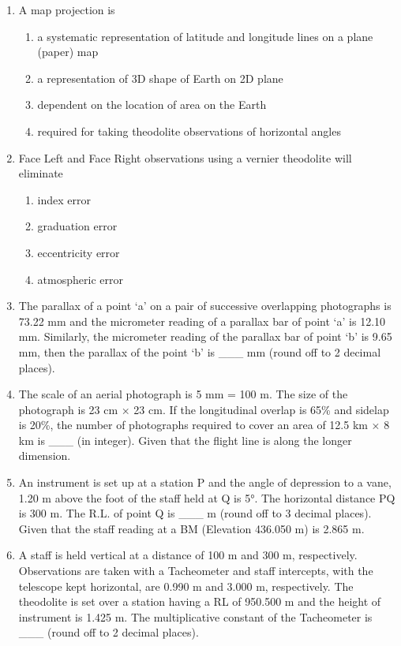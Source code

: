 \documentclass[12pt,a4paper]{article}
\begin{document}
\begin{enumerate}
\item A map projection is
\begin{enumerate}
    \item a systematic representation of latitude and longitude lines on a plane (paper) map
    \item a representation of 3D shape of Earth on 2D plane
    \item dependent on the location of area on the Earth
    \item required for taking theodolite observations of horizontal angles
\end{enumerate}

\item Face Left and Face Right observations using a vernier theodolite will eliminate
\begin{enumerate}
    \item index error
    \item graduation error
    \item eccentricity error
    \item atmospheric error
\end{enumerate}

\item The parallax of a point ‘a’ on a pair of successive overlapping photographs is 73.22 mm and the micrometer reading of a parallax bar of point ‘a’ is 12.10 mm. Similarly, the micrometer reading of the parallax bar of point ‘b’ is 9.65 mm, then the parallax of the point ‘b’ is \_\_\_ mm (round off to 2 decimal places).

\item The scale of an aerial photograph is 5 mm = 100 m. The size of the photograph is 23 cm × 23 cm. If the longitudinal overlap is 65\% and sidelap is 20\%, the number of photographs required to cover an area of 12.5 km × 8 km is \_\_\_ (in integer). Given that the flight line is along the longer dimension.

\item An instrument is set up at a station P and the angle of depression to a vane, 1.20 m above the foot of the staff held at Q is 5°. The horizontal distance PQ is 300 m. The R.L. of point Q is \_\_\_ m (round off to 3 decimal places). Given that the staff reading at a BM (Elevation 436.050 m) is 2.865 m.

\item A staff is held vertical at a distance of 100 m and 300 m, respectively. Observations are taken with a Tacheometer and staff intercepts, with the telescope kept horizontal, are 0.990 m and 3.000 m, respectively. The theodolite is set over a station having a RL of 950.500 m and the height of instrument is 1.425 m. The multiplicative constant of the Tacheometer is \_\_\_ (round off to 2 decimal places).


\end{enumerate}
\end{document}
